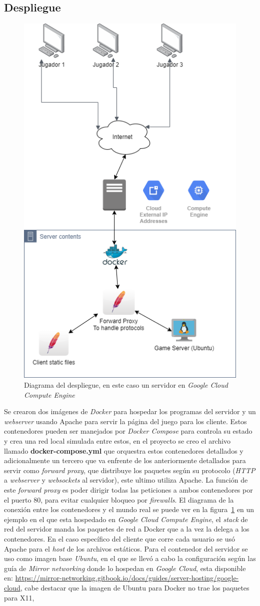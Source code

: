 \subsection{Despliegue}
\begin{figure}[H]
    \centering
    \includegraphics[width=0.5\linewidth]{images/diagrama_deployment.png}
    \caption{Diagrama del despliegue, en este caso un servidor en \textit{Google Cloud Compute Engine}}
    \label{fig:diagrama_despliege}
\end{figure}
Se crearon dos imágenes de \textit{Docker} para hospedar los programas del  servidor y un \textit{webserver} usando Apache para servir la página del juego para los cliente. Estos contenedores pueden ser manejados por \textit{Docker Compose} para controla su estado y crea una red local simulada entre estos, en el proyecto se creo el archivo llamado \textbf{docker-compose.yml} que orquestra estos contenedores detallados y adicionalmente un tercero que va enfrente de los anteriormente detallados para servir como \textit{forward proxy}, que distribuye los paquetes según su protocolo (\textit{HTTP} a \textit{webserver} y \textit{websockets} al servidor), este ultimo utiliza Apache. La función de este \textit{forward proxy} es poder dirigir todas las peticiones a ambos contenedores por el puerto 80, para evitar cualquier bloqueo por \textit{firewalls}. El diagrama de la conexión entre los contenedores y el mundo real se puede ver en la figura~\ref{fig:diagrama_despliege} en un ejemplo en el que esta hospedado en \textit{Google Cloud Compute Engine}, el \textit{stack} de red del servidor manda los paquetes de red a Docker que a la vez la delega a los contenedores.
En el caso específico del cliente que corre cada usuario se usó Apache para el \textit{host} de los archivos estáticos.
Para el contenedor del servidor se uso como imagen base \textit{Ubuntu}, en el que se llevó a cabo la configuración según las guía de \textit{Mirror networking} donde lo hospedan en \textit{Google Cloud}, esta disponible en: \url{https://mirror-networking.gitbook.io/docs/guides/server-hosting/google-cloud}, cabe destacar que la imagen de Ubuntu para Docker no trae los paquetes para X11, 

